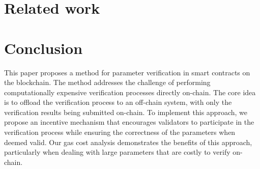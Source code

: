 \documentclass[runningheads]{llncs}
\begin{document}




\section{Related work}
\label{sec:related-work}

\section{Conclusion}
\label{sec:conclusion}
This paper proposes a method for parameter verification in smart contracts on the blockchain. The method addresses the challenge of performing computationally expensive verification processes directly on-chain. The core idea is to offload the verification process to an off-chain system, with only the verification results being submitted on-chain. To implement this approach, we propose an incentive mechanism that encourages validators to participate in the verification process while ensuring the correctness of the parameters when deemed valid. Our gas cost analysis demonstrates the benefits of this approach, particularly when dealing with large parameters that are costly to verify on-chain.
\newpage


\end{document}
